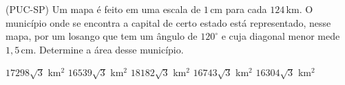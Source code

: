 \noindent\parbox{\linewidth}{

(PUC-SP) Um mapa é feito em uma escala de $1$\,cm para cada $124$\,km. O município onde se encontra a capital de certo estado está representado, nesse mapa, por um losango que tem um ângulo de $120^\circ$ e cuja diagonal menor mede $1{,}5$\,cm. Determine a área desse município.

$17298\sqrt{3}$ km$^2$
$16539\sqrt{3}$ km$^2$
$18182\sqrt{3}$ km$^2$
$16743\sqrt{3}$ km$^2$
$16304\sqrt{3}$ km$^2$



}


